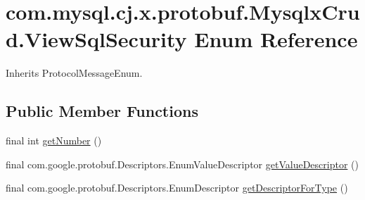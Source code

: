\hypertarget{enumcom_1_1mysql_1_1cj_1_1x_1_1protobuf_1_1_mysqlx_crud_1_1_view_sql_security}{}\section{com.\+mysql.\+cj.\+x.\+protobuf.\+Mysqlx\+Crud.\+View\+Sql\+Security Enum Reference}
\label{enumcom_1_1mysql_1_1cj_1_1x_1_1protobuf_1_1_mysqlx_crud_1_1_view_sql_security}


Inherits Protocol\+Message\+Enum.

\subsection*{Public Member Functions}
\begin{DoxyCompactItemize}
\item 
final int \mbox{\hyperlink{enumcom_1_1mysql_1_1cj_1_1x_1_1protobuf_1_1_mysqlx_crud_1_1_view_sql_security_ab2e1b685878553a5d0526e614905f291}{get\+Number}} ()
\item 
final com.\+google.\+protobuf.\+Descriptors.\+Enum\+Value\+Descriptor \mbox{\hyperlink{enumcom_1_1mysql_1_1cj_1_1x_1_1protobuf_1_1_mysqlx_crud_1_1_view_sql_security_a332cfd7d43dd39e0ca639f7edd6818e6}{get\+Value\+Descriptor}} ()
\item 
final com.\+google.\+protobuf.\+Descriptors.\+Enum\+Descriptor \mbox{\hyperlink{enumcom_1_1mysql_1_1cj_1_1x_1_1protobuf_1_1_mysqlx_crud_1_1_view_sql_security_a6ee7eaff3dc589bb16f9451998f8b810}{get\+Descriptor\+For\+Type}} ()
\end{DoxyCompactItemize}

